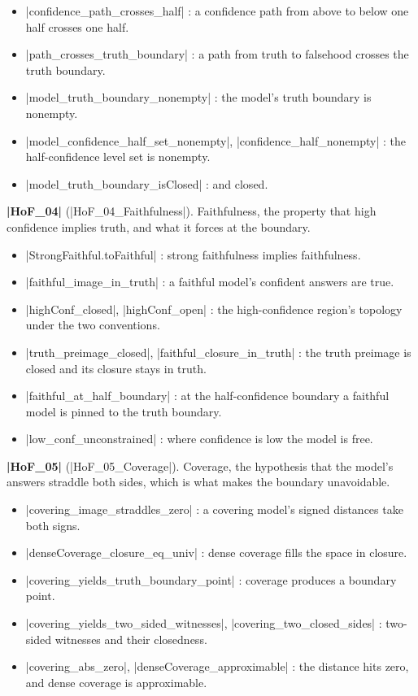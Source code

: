 \documentclass{memoir}
\begin{document}
\begin{itemize}
\item \LeanVerb|confidence_path_crosses_half| : a confidence path from above to below one half
   crosses one half.
\item \LeanVerb|path_crosses_truth_boundary| : a path from truth to falsehood crosses the truth
   boundary.
\item \LeanVerb|model_truth_boundary_nonempty| : the model's truth boundary is nonempty.
\item \LeanVerb|model_confidence_half_set_nonempty|, \LeanVerb|confidence_half_nonempty| : the
   half-confidence level set is nonempty.
\item \LeanVerb|model_truth_boundary_isClosed| : and closed.

\end{itemize}


\textbf{\LeanVerb|HoF_04|} (\LeanVerb|HoF_04_Faithfulness|). Faithfulness, the property that high confidence
implies truth, and what it forces at the boundary.

\begin{itemize}
\item \LeanVerb|StrongFaithful.toFaithful| : strong faithfulness implies faithfulness.
\item \LeanVerb|faithful_image_in_truth| : a faithful model's confident answers are true.
\item \LeanVerb|highConf_closed|, \LeanVerb|highConf_open| : the high-confidence region's topology under
   the two conventions.
\item \LeanVerb|truth_preimage_closed|, \LeanVerb|faithful_closure_in_truth| : the truth preimage is
   closed and its closure stays in truth.
\item \LeanVerb|faithful_at_half_boundary| : at the half-confidence boundary a faithful model is
   pinned to the truth boundary.
\item \LeanVerb|low_conf_unconstrained| : where confidence is low the model is free.

\end{itemize}


\textbf{\LeanVerb|HoF_05|} (\LeanVerb|HoF_05_Coverage|). Coverage, the hypothesis that the model's answers
straddle both sides, which is what makes the boundary unavoidable.

\begin{itemize}
\item \LeanVerb|covering_image_straddles_zero| : a covering model's signed distances take both
   signs.
\item \LeanVerb|denseCoverage_closure_eq_univ| : dense coverage fills the space in closure.
\item \LeanVerb|covering_yields_truth_boundary_point| : coverage produces a boundary point.
\item \LeanVerb|covering_yields_two_sided_witnesses|, \LeanVerb|covering_two_closed_sides| : two-sided
   witnesses and their closedness.
\item \LeanVerb|covering_abs_zero|, \LeanVerb|denseCoverage_approximable| : the distance hits zero, and
   dense coverage is approximable.

\end{itemize}
\end{document}

